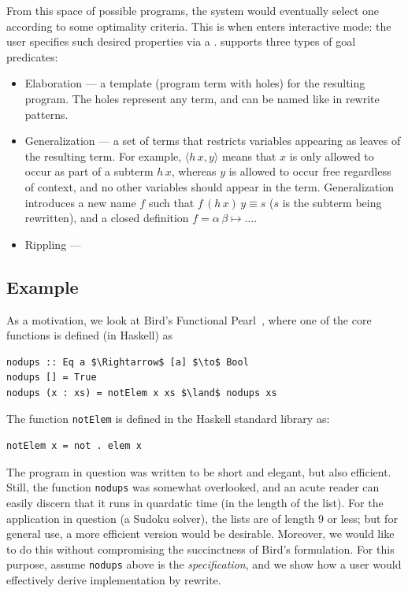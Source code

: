 From this space of possible programs, the system would eventually select
one according to some optimality criteria.
This is when \TransCal enters interactive mode: the user specifies such
desired properties via a .
\TransCal supports three types of goal predicates:
\begin{itemize}
  \item Elaboration --- a template (program term with holes) for the resulting
    program.
    The holes represent any term, and can be named like in rewrite patterns.
  \item Generalization --- a set of terms that restricts variables appearing
    as leaves of the resulting term. For example, $\langle h\,x, y\rangle$
    means that $x$ is only allowed to occur as part of a subterm $h\,x$,
    whereas $y$ is allowed to occur free regardless of context, and no other
    variables should appear in the term.
    Generalization introduces a new name $f$ such that $f\,(h\,x)\,y \equiv s$
    ($s$ is the subterm being rewritten),
    and a closed definition $f = \alpha\,\beta \mapsto \ldots$.
  \item Rippling --- 
\end{itemize}

\subsection{Example}

As a motivation, we look at Bird's Functional Pearl~\cite{bird2006functional},
where one of the core functions is defined (in Haskell) as

\begin{lstlisting}[mathescape]
nodups :: Eq a $\Rightarrow$ [a] $\to$ Bool
nodups [] = True
nodups (x : xs) = notElem x xs $\land$ nodups xs
\end{lstlisting}

The function \lstinline!notElem! is defined in the Haskell standard library as:

\begin{lstlisting}[mathescape]
notElem x = not . elem x
\end{lstlisting}

The program in question was written to be short and elegant, but also
efficient. Still, the function \lstinline!nodups! was somewhat overlooked,
and an acute reader can easily discern that it runs in quardatic time
(in the length of the list). For the application in question (a Sudoku solver),
the lists are of length 9 or less; but for general use, a more efficient
version would be desirable. Moreover, we would like to do this without
compromising the succinctness of Bird's formulation. For this purpose,
assume \lstinline!nodups! above is the \emph{specification}, and we show how
a user would effectively derive implementation by rewrite.

